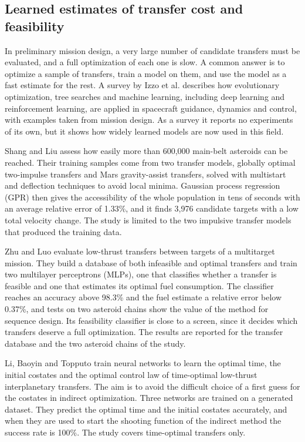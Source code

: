 \subsection{Learned estimates of transfer cost and feasibility}
\label{sec:rw-cost}

In preliminary mission design, a very large number of candidate transfers must be evaluated, and a full optimization of each one is slow. A common answer is to optimize a sample of transfers, train a model on them, and use the model as a fast estimate for the rest. A survey by Izzo et al. \cite{izzo2019survey} describes how evolutionary optimization, tree searches and machine learning, including deep learning and reinforcement learning, are applied in spacecraft guidance, dynamics and control, with examples taken from mission design. As a survey it reports no experiments of its own, but it shows how widely learned models are now used in this field.

Shang and Liu \cite{shang2017} assess how easily more than 600,000 main-belt asteroids can be reached. Their training samples come from two transfer models, globally optimal two-impulse transfers and Mars gravity-assist transfers, solved with multistart and deflection techniques to avoid local minima. Gaussian process regression (GPR) then gives the accessibility of the whole population in tens of seconds with an average relative error of 1.33\%, and it finds 3,976 candidate targets with a low total velocity change. The study is limited to the two impulsive transfer models that produced the training data.

Zhu and Luo \cite{zhu2019} evaluate low-thrust transfers between targets of a multitarget mission. They build a database of both infeasible and optimal transfers and train two multilayer perceptrons (MLPs), one that classifies whether a transfer is feasible and one that estimates its optimal fuel consumption. The classifier reaches an accuracy above 98.3\% and the fuel estimate a relative error below 0.37\%, and tests on two asteroid chains show the value of the method for sequence design. Its feasibility classifier is close to a screen, since it decides which transfers deserve a full optimization. The results are reported for the transfer database and the two asteroid chains of the study.

Li, Baoyin and Topputo \cite{li2019access} train neural networks to learn the optimal time, the initial costates and the optimal control law of time-optimal low-thrust interplanetary transfers. The aim is to avoid the difficult choice of a first guess for the costates in indirect optimization. Three networks are trained on a generated dataset. They predict the optimal time and the initial costates accurately, and when they are used to start the shooting function of the indirect method the success rate is 100\%. The study covers time-optimal transfers only.

